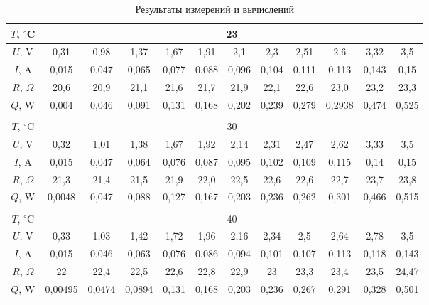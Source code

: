 \documentclass[12pt, a4paper]{article}
\begin{document}
\begin{table}[H]
\centering
\caption{Результаты измерений и вычислений}
\label{table:results_1}
\begin{tabular}{|c|c|c|c|c|c|c|c|c|c|c|c|}
\hline
$T$, $^\circ$C   & \multicolumn{11}{c|}{23}                                           \\ \hline
$U$, V   & 0,31  & 0,98  & 1,37  & 1,67  & 1,91  & 2,1  & 2,3  & 2,51 & 2,6 & 3,32 & 3,5 \\ \hline
$I$, A   & 0,015  & 0,047  & 0,065  & 0,077  & 0,088 & 0,096  & 0,104 & 0,111 & 0,113 & 0,143 & 0,15 \\ \hline
$R$, $\Omega$ & 20,6  & 20,9  & 21,1 & 21,6 & 21,7 & 21,9 & 22,1 & 22,6 & 23,0 & 23,2 & 23,3 \\ \hline
$Q$, W    & 0,004  & 0,046  & 0,091  & 0,131  & 0,168  & 0,202  & 0,239 & 0,279 & 0,2938 & 0,474 & 0,525  \\ \hline
\multicolumn{12}{|c|}{}                                                        \\ \hline
$T$, $^\circ$C   & \multicolumn{11}{c|}{30}                                           \\ \hline
$U$, V   & 0,32  & 1,01  & 1,38  & 1,67  & 1,92 & 2,14  & 2,31 & 2,47 & 2,62 & 3,33 & 3,5  \\ \hline
$I$, A   & 0,015  & 0,047  & 0,064  & 0,076  & 0,087  & 0,095  & 0,102 & 0,109 & 0,115 & 0,14 & 0,15 \\ \hline
$R$, $\Omega$ & 21,3 & 21,4 & 21,5 & 21,9 & 22,0 & 22,5 & 22,6 & 22,6 & 22,7 & 23,7 & 23,8 \\ \hline
$Q$, W    & 0,0048  & 0,047  & 0,088  & 0,127  & 0,167  & 0,203  & 0,236 & 0,262 & 0,301 & 0,466 & 0,515 \\ \hline
\multicolumn{12}{|c|}{}                                                        \\ \hline
$T$, $^\circ$C   & \multicolumn{11}{c|}{40}                                           \\ \hline
$U$, V   & 0,33  & 1,03  & 1,42  & 1,72  & 1,96  & 2,16  &  2,34 & 2,5 & 2,64 & 2,78 & 3,5 \\ \hline
$I$, A   & 0,015  & 0,046  & 0,063  & 0,076  & 0,086  & 0,094  & 0,101 & 0,107 & 0,113 & 0,118 & 0,143\\ \hline
$R$, $\Omega$ & 22 & 22,4 & 22,5 & 22,6 & 22,8 & 22,9 & 23 & 23,3 & 23,4 & 23,5 & 24,47 \\ \hline
$Q$, W    & 0,00495  & 0,0474  & 0,0894  & 0,131  & 0,168  & 0,203  & 0,236 & 0,267 & 0,291 & 0,328 & 0,501  \\ \hline

\end{tabular}
\end{table}
\end{document}
